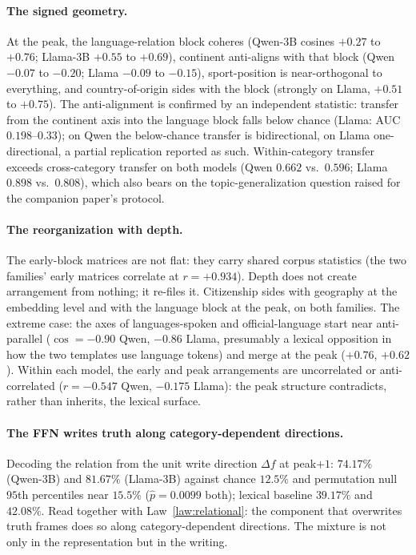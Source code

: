 \documentclass[11pt]{article}
\begin{document}
\paragraph{The signed geometry.} At the peak, the language-relation block
coheres (Qwen-3B cosines $+0.27$ to $+0.76$; Llama-3B $+0.55$ to $+0.69$),
continent anti-aligns with that block (Qwen $-0.07$ to $-0.20$; Llama
$-0.09$ to $-0.15$), sport-position is near-orthogonal to everything, and
country-of-origin sides with the block (strongly on Llama, $+0.51$ to
$+0.75$). The anti-alignment is confirmed by an independent statistic:
transfer from the continent axis into the language block falls below
chance (Llama: AUC $0.198$--$0.33$); on Qwen the below-chance transfer is
bidirectional, on Llama one-directional, a partial replication reported as
such. Within-category transfer exceeds cross-category transfer on both
models (Qwen $0.662$ vs.\ $0.596$; Llama $0.898$ vs.\ $0.808$), which also
bears on the topic-generalization question raised for the companion
paper's protocol.

\paragraph{The reorganization with depth.} The early-block matrices are
not flat: they carry shared corpus statistics (the two families' early
matrices correlate at $r = +0.934$). Depth does not create arrangement from
nothing; it re-files it. Citizenship sides with geography at the embedding
level and with the language block at the peak, on both families. The
extreme case: the axes of languages-spoken and official-language start near
anti-parallel ($\cos = -0.90$ Qwen, $-0.86$ Llama, presumably a lexical
opposition in how the two templates use language tokens) and merge at the
peak ($+0.76$, $+0.62$). Within each model, the early and peak
arrangements are uncorrelated or anti-correlated ($r = -0.547$ Qwen,
$-0.175$ Llama): the peak structure contradicts, rather than inherits, the
lexical surface.

\paragraph{The FFN writes truth along category-dependent directions.}
Decoding the relation from the unit write direction $\Delta f$ at
peak$+1$: $74.17\%$ (Qwen-3B) and $81.67\%$ (Llama-3B) against chance
$12.5\%$ and permutation null $95$th percentiles near $15.5\%$
($\hat p = 0.0099$ both); lexical baseline $39.17\%$ and $42.08\%$. Read
together with Law~\ref{law:relational}: the component that overwrites truth
frames does so along category-dependent directions. The mixture is not
only in the representation but in the writing.
\end{document}
